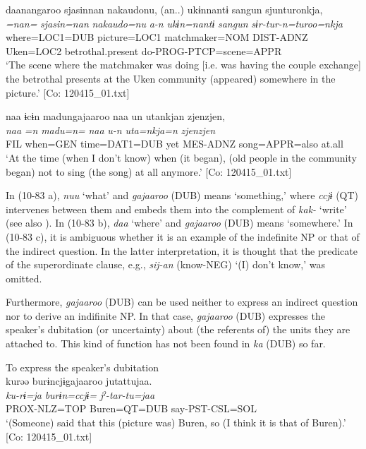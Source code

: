   \ex  %
      \glll    daanangaroo  sjasinnan  {\textbar}nakaudo{\textbar}nu,  (an..)  ukɨnnantɨ  sangun  sjunturonkja,\\
      \textit{=nan=}  \textit{sjasin=nan}  \textit{nakaudo=nu}  \textit{a-n}  \textit{ukɨn=nantɨ}  \textit{sangun}  \textit{sɨr-tur-n=turoo=nkja}\\
      where=LOC1=DUB  picture=LOC1  matchmaker=NOM  DIST-ADNZ  Uken=LOC2  betrothal.present  do-PROG-PTCP=scene=APPR\\
      \glt       ‘The scene where the matchmaker was doing [i.e. was having the couple exchange] the betrothal presents at the Uken community (appeared) somewhere in the picture.’ [Co: 120415\_01.txt]

  \ex  %
      \glll    naa  ɨcɨn  madungajaaroo  naa  un  utankjan  {\textbar}zjenzjen{\textbar},\\
      \textit{naa}  \textit{=n}  \textit{madu=n=}  \textit{naa}  \textit{u-n}  \textit{uta=nkja=n} \textit{zjenzjen}\\
      FIL  when=GEN  time=DAT1=DUB  yet  MES-ADNZ  song=APPR=also  at.all\\
      \glt       ‘At the time (when I don’t know) when (it began), (old people in the community began) not to sing (the song) at all anymore.’ [Co: 120415\_01.txt]
    \z
\z

In (10-83 a), \textit{nuu} ‘what’ and \textit{gajaaroo} (DUB) means ‘something,’ where \textit{ccjɨ} (QT) intervenes between them and embeds them into the complement of \textit{kak-} ‘write’ (see also ). In (10-83 b), \textit{daa} ‘where’ and \textit{gajaaroo} (DUB) means ‘somewhere.’ In (10-83 c), it is ambiguous whether it is an example of the indefinite NP or that of the indirect question. In the latter interpretation, it is thought that the predicate of the superordinate clause, e.g., \textit{sij-an} (know-NEG) ‘(I) don’t know,’ was omitted.

Furthermore, \textit{gajaaroo} (DUB) can be used neither to express an indirect question nor to derive an indifinite NP. In that case, \textit{gajaaroo} (DUB) expresses the speaker’s dubitation (or uncertainty) about (the referents of) the units they are attached to. This kind of function has not been found in \textit{ka} (DUB) so far.

\ea\label{ex:10.84}   To express the speaker’s dubitation\\
  \ea  %
      \glll    kurəə  burɨncjɨgajaaroo  jutattujaa.\\
      \textit{ku-rɨ=ja}  \textit{burɨn=ccjɨ=}  \textit{jˀ-tar-tu=jaa}\\
      PROX-NLZ=TOP  Buren=QT=DUB  say-PST-CSL=SOL\\
      \glt       ‘(Someone) said that this (picture was) Buren, so (I think it is that of Buren).’ [Co: 120415\_01.txt]

